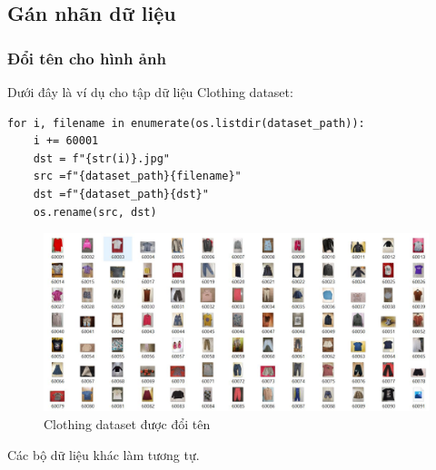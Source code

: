 \newpage
\subsection{Gán nhãn dữ liệu}
\subsubsection{Đổi tên cho hình ảnh}
Dưới đây là ví dụ cho tập dữ liệu Clothing dataset:
\begin{lstlisting}
for i, filename in enumerate(os.listdir(dataset_path)):
    i += 60001
    dst = f"{str(i)}.jpg"
    src =f"{dataset_path}{filename}"
    dst =f"{dataset_path}{dst}"
    os.rename(src, dst)
\end{lstlisting}
\begin{center}
    \begin{figure}[!h]
        \centering
        \includegraphics[scale = 0.6]{fileanh/47.jpg}
        \caption{Clothing dataset được đổi tên}
    \end{figure}
\end{center}
\begin{cy}
Các bộ dữ liệu khác làm tương tự.
\end{cy}


